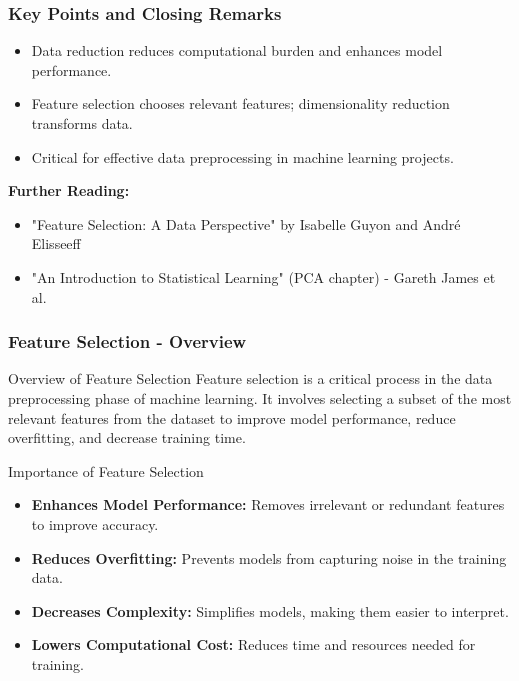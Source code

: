 \documentclass[aspectratio=169]{beamer}
\begin{document}
\begin{frame}[fragile]
    \frametitle{Key Points and Closing Remarks}
    \begin{itemize}
        \item Data reduction reduces computational burden and enhances model performance.
        \item Feature selection chooses relevant features; dimensionality reduction transforms data.
        \item Critical for effective data preprocessing in machine learning projects.
    \end{itemize}

    \textbf{Further Reading:}
    \begin{itemize}
        \item "Feature Selection: A Data Perspective" by Isabelle Guyon and André Elisseeff
        \item "An Introduction to Statistical Learning" (PCA chapter) - Gareth James et al.
    \end{itemize}
\end{frame}

\begin{frame}[fragile]
    \frametitle{Feature Selection - Overview}
    \begin{block}{Overview of Feature Selection}
        Feature selection is a critical process in the data preprocessing phase of machine learning. It involves selecting a subset of the most relevant features from the dataset to improve model performance, reduce overfitting, and decrease training time.
    \end{block}
    
    \begin{block}{Importance of Feature Selection}
        \begin{itemize}
            \item \textbf{Enhances Model Performance:} Removes irrelevant or redundant features to improve accuracy.
            \item \textbf{Reduces Overfitting:} Prevents models from capturing noise in the training data.
            \item \textbf{Decreases Complexity:} Simplifies models, making them easier to interpret.
            \item \textbf{Lowers Computational Cost:} Reduces time and resources needed for training.
        \end{itemize}
    \end{block}
\end{frame}
\end{document}
